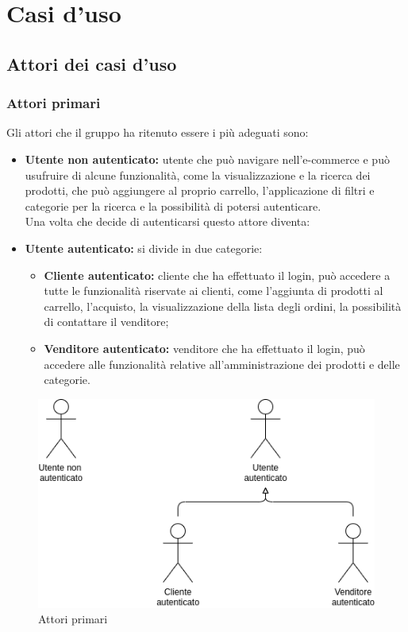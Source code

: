 \section{Casi d'uso}
\subsection{Attori dei casi d'uso}
\subsubsection{Attori primari}
Gli attori che il gruppo ha ritenuto essere i più adeguati sono:
\begin{itemize}
    \item \textbf{Utente non autenticato:} utente che può navigare nell'e-commerce e può usufruire di alcune funzionalità, come la visualizzazione e la ricerca dei prodotti, che può aggiungere al proprio carrello, l'applicazione di filtri e categorie per la ricerca e la possibilità di potersi autenticare.\\
          Una volta che decide di autenticarsi questo attore diventa:
    \item \textbf{Utente autenticato:} si divide in due categorie:
          \begin{itemize}
              \item \textbf{Cliente autenticato:} cliente che ha effettuato il login, può accedere a tutte le funzionalità riservate ai clienti, come l'aggiunta di prodotti al carrello, l'acquisto, la visualizzazione della lista degli ordini, la possibilità di contattare il venditore;
              \item \textbf{Venditore autenticato:} venditore che ha effettuato il login, può accedere alle funzionalità relative all'amministrazione dei prodotti e delle categorie.
          \end{itemize}
\end{itemize}
\begin{figure}[!ht]
    \caption{Attori primari}
    \vspace{10px}
    \includegraphics[scale=0.6]{../../../Images/AnalisiRequisiti/attori}
    \centering
\end{figure}
